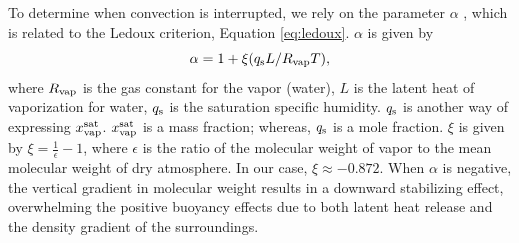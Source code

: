 \documentclass[11pt]{ucscthesisbs}
\begin{document}
To determine when convection is interrupted, we rely on the parameter $\alpha$ \citep{friedson_2017}, which is related to the Ledoux criterion, Equation \ref{eq:ledoux}. $\alpha$ is given by
\begin{equation}
  \alpha = 1 + \xi (q_{\rm s} L / R_{\rm vap} T) ,
  \label{eq:alpha}
\end{equation}
where $R_{\rm vap}$ is the gas constant for the vapor (water), $L$ is the latent heat of vaporization for water, $q_{\rm s}$ is the saturation specific humidity. $q_{\rm s}$ is another way of expressing $x_{\rm vap}^{\rm sat}$. $x_{\rm vap}^{\rm sat}$ is a mass fraction; whereas, $q_{\rm s}$ is a mole fraction. $\xi$ is given by $\xi = \frac{1}{\epsilon} - 1$, where $\epsilon$ is the ratio of the molecular weight of vapor to the mean molecular weight of dry atmosphere. In our case, $\xi \approx -0.872$. When $\alpha$ is negative, the vertical gradient in molecular weight results in a downward stabilizing effect, overwhelming the positive buoyancy effects due to both latent heat release and the density gradient of the surroundings.
\end{document}
